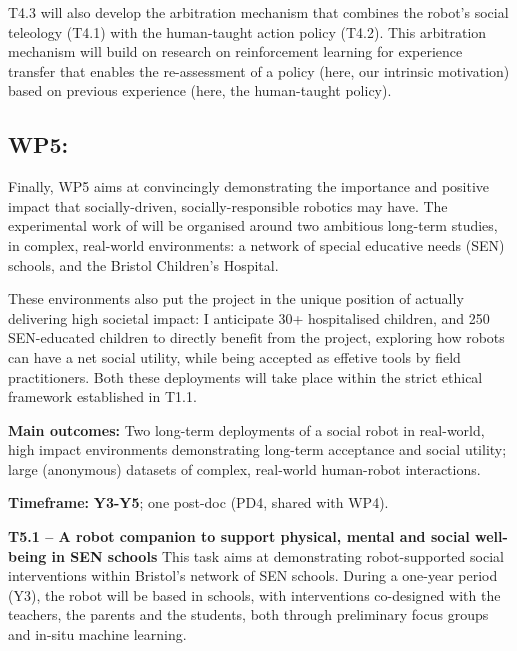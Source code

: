 T4.3 will also develop the arbitration mechanism that combines the robot's
social teleology (T4.1) with the human-taught action policy (T4.2). This
arbitration mechanism will build on research on reinforcement learning for
experience transfer that enables the re-assessment of
a policy (here, our intrinsic motivation) based on previous experience (here,
the human-taught policy).

\subsection{WP5: \textbf{\wpFive}}

Finally, WP5 aims at convincingly demonstrating the importance and positive
impact that socially-driven, socially-responsible robotics may have. The
experimental work of \project will be organised around two ambitious long-term
studies, in complex, real-world environments: a network of special educative
needs (SEN) schools, and the Bristol Children's Hospital.

These environments also put the project in the unique position of actually
delivering high societal impact: I anticipate 30+ hospitalised children, and 250
SEN-educated children to directly benefit from the project, exploring how robots
can have a net social utility, while being accepted as effetive tools by field
practitioners. Both these deployments will take place within the strict ethical
framework established in T1.1.

\begin{oframed}

    \textbf{Main outcomes:} Two long-term deployments of a social robot in
    real-world, high impact environments demonstrating long-term acceptance and
    social utility; large (anonymous) datasets of complex, real-world
    human-robot interactions.

    \textbf{Timeframe:} \textbf{Y3-Y5}; one post-doc (PD4, shared with WP4).

\end{oframed}

\textbf{T5.1 -- A robot companion to support physical, mental and social
well-being in SEN schools} This task aims at demonstrating robot-supported
social interventions within Bristol's network of SEN schools.  During a one-year
period (Y3), the robot will be based in schools, with interventions co-designed
with the teachers, the parents and the students, both through preliminary
focus groups and in-situ machine learning.

